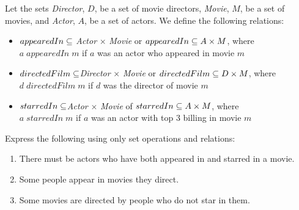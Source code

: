 \begin{questions}
	\ifprintanswers
        \vspace{-5pt}
    \fi
{} Let the sets \textit{Director}, $D$, be a set of movie directors, \textit{Movie}, $M$, be a set of movies, and \textit{Actor}, $A$, be a set of actors.  We define the following relations: 
\begin{itemize}
	\item $appearedIn \subseteq $ \textit{Actor} $\times$ \textit{Movie} or $appearedIn \subseteq A \times M$, where \\  $a \;appearedIn\; m$ if $a$ was an actor who appeared in movie $m$
	\item $directedFilm \subseteq $\textit{Director} $\times$ \textit{Movie} or $directedFilm \subseteq D \times M$, where \\
	$d \;directedFilm\; m$ if $d$ was the director of movie $m$ 
	\item $starredIn \subseteq $\textit{Actor} $\times$ \textit{Movie} of $starredIn \subseteq A \times M$, where \\
	$a \;starredIn\; m$ if $a$ was an actor with top 3 billing in movie $m$ 
\end{itemize}

Express the following using only set operations and relations: 
\begin{enumerate}[label=(\alph*),itemsep=2pt,parsep=0pt,topsep=0pt,partopsep=0pt]
	\item There must be actors who have both appeared in and starred in a movie. 
	\item Some people appear in movies they direct. 
	\item Some movies are directed by people who do not star in them. 
\end{enumerate}


\end{questions}
